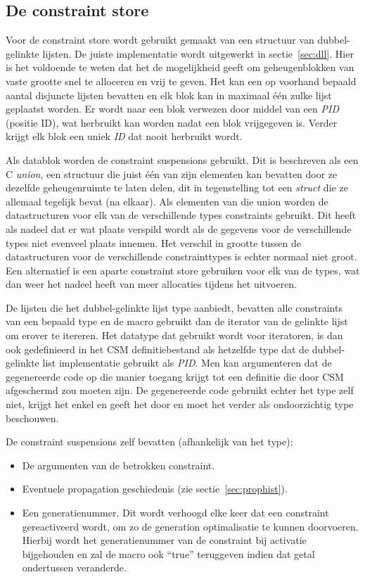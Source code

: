{\subsection{De constraint store} \label{sec:constore}

Voor de constraint store wordt gebruikt gemaakt van een structuur van dubbel-gelinkte lijsten. De juiste implementatie wordt uitgewerkt in sectie~\ref{sec:dll}. Hier is het voldoende te weten dat het de mogelijkheid geeft om geheugenblokken van vaste grootte snel te alloceren en vrij te geven. Het kan een op voorhand bepaald aantal disjuncte lijsten bevatten en elk blok kan in maximaal \'e\'en zulke lijst geplaatst worden. Er wordt naar een blok verwezen door middel van een {\em PID} (positie ID), wat herbruikt kan worden nadat een blok vrijgegeven is. Verder krijgt elk blok een uniek {\em ID} dat nooit herbruikt wordt.

Als datablok worden de constraint suspensions gebruikt. Dit is beschreven als een C {\em union}, een structuur die juist \'e\'en van zijn elementen kan bevatten door ze dezelfde geheugenruimte te laten delen, dit in tegenstelling tot een {\em struct} die ze allemaal tegelijk bevat (na elkaar). Als elementen van die union worden de datastructuren voor elk van de verschillende types constraints gebruikt. Dit heeft als nadeel dat er wat plaats verspild wordt als de gegevens voor de verschillende types niet evenveel plaats innemen. Het verschil in grootte tussen de datastructuren voor de verschillende constrainttypes is echter normaal niet groot. Een alternatief is een aparte constraint store gebruiken voor elk van de types, wat dan weer het nadeel heeft van meer allocaties tijdens het uitvoeren.

De lijsten die het dubbel-gelinkte lijst type aanbiedt, bevatten alle constraints van een bepaald type en de  macro gebruikt dan de iterator van de gelinkte lijst om erover te itereren. Het  datatype dat gebruikt wordt voor iteratoren, is dan ook gedefinieerd in het CSM definitiebestand als hetzelfde type dat de dubbel-gelinkte list implementatie gebruikt als {\em PID}. Men kan argumenteren dat de gegenereerde code op die manier toegang krijgt tot een definitie die door CSM afgeschermd zou moeten zijn. De gegenereerde code gebruikt echter het  type zelf niet, krijgt het enkel en geeft het door en moet het verder als ondoorzichtig type beschouwen.

De constraint suspensions zelf bevatten (afhankelijk van het type): \begin{itemize}
  \item De argumenten van de betrokken constraint.
  \item Eventuele propagation geschiedenis (zie sectie~\ref{sec:prophist}).
  \item Een generatienummer. Dit wordt verhoogd elke keer dat een constraint gereactiveerd wordt, om zo de generation optimalisatie te kunnen doorvoeren. Hierbij wordt het generatienummer van de constraint bij activatie bijgehouden en zal de  macro ook ``true'' teruggeven indien dat getal ondertussen veranderde.
\end{itemize}

}

